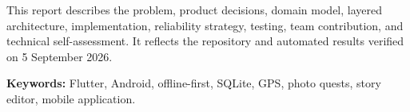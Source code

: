 This report describes the problem, product decisions, domain model, layered
architecture, implementation, reliability strategy, testing, team contribution,
and technical self-assessment. It reflects the repository and automated results
verified on 5 September 2026.

\textbf{Keywords:} Flutter, Android, offline-first, SQLite, GPS, photo quests,
story editor, mobile application.
